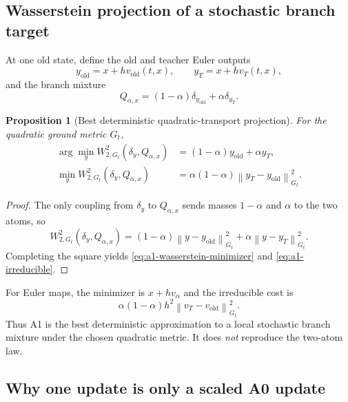 \documentclass[11pt,a4paper]{article}
\newcommand{\norm}[1]{\left\lVert #1 \right\rVert}
\newcommand{\vold}{v_{\mathrm{old}}}
\newcommand{\vT}{v_T}
\theoremstyle{plain}
\newtheorem{proposition}[theorem]{Proposition}
\theoremstyle{definition}
\begin{document}
\subsection{Wasserstein projection of a stochastic branch target}

At one old state, define the old and teacher Euler outputs
\begin{equation}
y_{\mathrm{old}}=x+h\vold(t,x),
\qquad
y_T=x+h\vT(t,x),
\end{equation}
and the branch mixture
\begin{equation}
Q_{\alpha,x}
=(1-\alpha)\delta_{y_{\mathrm{old}}}
+\alpha\delta_{y_T}.
\label{eq:a1-branch-mixture}
\end{equation}

\begin{proposition}[Best deterministic quadratic-transport projection]
\label{prop:a1-wasserstein}
For the quadratic ground metric $G_t$,
\begin{align}
\arg\min_y W_{2,G_t}^2(\delta_y,Q_{\alpha,x})
&=(1-\alpha)y_{\mathrm{old}}+\alpha y_T,
\label{eq:a1-wasserstein-minimizer}\\
\min_y W_{2,G_t}^2(\delta_y,Q_{\alpha,x})
&=\alpha(1-\alpha)
  \norm{y_T-y_{\mathrm{old}}}_{G_t}^2 .
\label{eq:a1-irreducible}
\end{align}
\end{proposition}

\begin{proof}
The only coupling from $\delta_y$ to $Q_{\alpha,x}$ sends masses $1-\alpha$ and $\alpha$ to the
two atoms, so
\[
W_{2,G_t}^2(\delta_y,Q_{\alpha,x})
=(1-\alpha)\norm{y-y_{\mathrm{old}}}_{G_t}^2
+\alpha\norm{y-y_T}_{G_t}^2.
\]
Completing the square yields \eqref{eq:a1-wasserstein-minimizer} and
\eqref{eq:a1-irreducible}.
\end{proof}

For Euler maps, the minimizer is $x+h v_\alpha$ and the irreducible cost is
\begin{equation}
\alpha(1-\alpha)h^2\norm{\vT-\vold}_{G_t}^2 .
\label{eq:a1-euler-cost}
\end{equation}
Thus A1 is the best deterministic approximation to a local stochastic branch mixture under the
chosen quadratic metric.  It does \emph{not} reproduce the two-atom law.

\subsection{Why one update is only a scaled A0 update}
\end{document}
